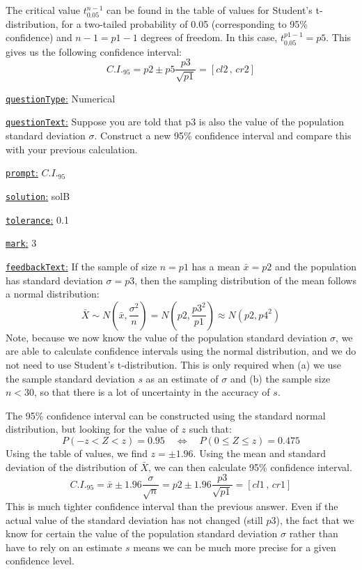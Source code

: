\documentclass[preview]{standalone}
\newcommand \fieldname[1]{\underline{\texttt{#1}:}}
\begin{document}
The critical value $t_{0.05}^{n-1}$ can be found in the table of values for Student's t-distribution, for a two-tailed probability of 0.05 (corresponding to 95\% confidence) and $n-1 = {{p1}-1}$ degrees of freedom. In this case, $t_{0.05}^{{p1}-1} = {p5}$. This gives us the following confidence interval:
\[
C.I._{95} =  {p2} \pm {p5}\frac{{p3}}{\sqrt{{p1}}}  =  \left[{cl2} \, , \, {cr2}\right]
\]

\fieldname{questionType}
Numerical

\fieldname{questionText}
Suppose you are told that {p3} is also the value of the population standard deviation $\sigma$. Construct a new 95\% confidence interval and compare this with your previous calculation.

\fieldname{prompt}
$C.I._{95}$

\fieldname{solution}
solB

\fieldname{tolerance}
0.1

\fieldname{mark}
3

\fieldname{feedbackText}
If the sample of size $n={p1}$ has a mean $\bar x = {p2}$ and the population has standard deviation $\sigma={p3}$, then the sampling distribution of the mean follows a normal distribution:
\[
\bar X \sim N \left(\bar x,\frac{\sigma^2}{n}\right) = N \left({p2},\frac{{p3}^2}{{p1}}\right) \approx N \left({p2},{p4}^2\right)
\]
Note, because we now know the value of the population standard deviation $\sigma$, we are able to calculate confidence intervals using the normal distribution, and we do not need to use Student's t-distribution. This is only required when (a) we use the sample standard deviation $s$ as an estimate of $\sigma$ and (b) the sample size $n<30$, so that there is a lot of uncertainty in the accuracy of $s$.

The 95\% confidence interval can be constructed using the standard normal distribution, but looking for the value of $z$ such that:
\[
P(-z < Z < z) = 0.95 \quad \iff \quad P(0 \le Z \le z) = 0.475
\]
Using the table of values, we find $z = \pm 1.96$. Using the mean and standard deviation of the distribution of $\bar X$, we can then calculate 95\% confidence interval.
\[
C.I._{95} = \bar x \pm 1.96 \frac{\sigma}{\sqrt{n}} = {p2} \pm 1.96 \frac{{p3}}{\sqrt{{p1}}} = \left[{cl1} \, , \, {cr1}\right]
\]
This is much tighter confidence interval than the previous answer. Even if the actual value of the standard deviation has not changed (still $p3$), the fact that we know for certain the value of the population standard deviation $\sigma$ rather than have to rely on an estimate $s$ means we can be much more precise for a given confidence level.

\end{document}
